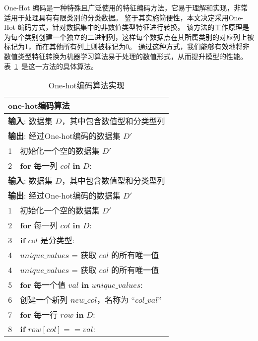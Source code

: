 One-Hot 编码是一种特殊且广泛使用的特征编码方法，它易于理解和实现，非常适用于处理具有有限类别的分类数据。
鉴于其实施简便性，本文决定采用One-Hot 编码方式，针对数据集中的非数值类型特征进行转换。
该方法的工作原理是为每个类别创建一个独立的二进制列，这样每个数据点在其所属类别的对应列上被标记为1，而在其他所有列上则被标记为0。
通过这种方式，我们能够有效地将非数值类型特征转换为机器学习算法易于处理的数值形式，从而提升模型的性能。
表~\ref{tab:onehot}~是这一方法的具体算法。\par
\begin{table}[htbp]
	\caption{One-hot编码算法实现}
	\label{tab:onehot}
	\centering
	\begin{tabularx}{1.0\textwidth}{cl}
		\toprule
		\multicolumn{2}{l}{\textbf{one-hot编码算法}}                              \\
		\midrule
		\multicolumn{2}{l}{\textbf{输入}: 数据集 $D$，其中包含数值型和分类型列}   \\
		\multicolumn{2}{l}{\textbf{输出}: 经过One-hot编码的数据集 $D'$}           \\
		1  & 初始化一个空的数据集 $D'$                                            \\
		2  & \textbf{for} 每一列 $col$ \textbf{in} $D$:                           \\
		\multicolumn{2}{l}{\textbf{输入}: 数据集 $D$，其中包含数值型和分类型列}   \\
		\multicolumn{2}{l}{\textbf{输出}: 经过One-hot编码的数据集 $D'$}           \\
		1  & 初始化一个空的数据集 $D'$                                            \\
		2  & \textbf{for} 每一列 $col$ \textbf{in} $D$:                           \\
		3  & \quad \textbf{if} $col$ 是分类型:                                    \\
		4  & \quad\quad $unique\_values$ = 获取 $col$ 的所有唯一值                \\
		4  & \quad\quad $unique\_values$ = 获取 $col$ 的所有唯一值                \\
		5  & \quad\quad \textbf{for} 每一个值 $val$ \textbf{in} $unique\_values$: \\
		6  & \quad\quad\quad 创建一个新列 $new\_col$，名称为 ``$col\_val$''       \\
		7  & \quad\quad\quad \textbf{for} 每一行 $row$ \textbf{in} $D$:           \\
		8  & \quad\quad\quad\quad \textbf{if} $row[col] == val$:                  \\

\end{tabularx}
\end{table}
